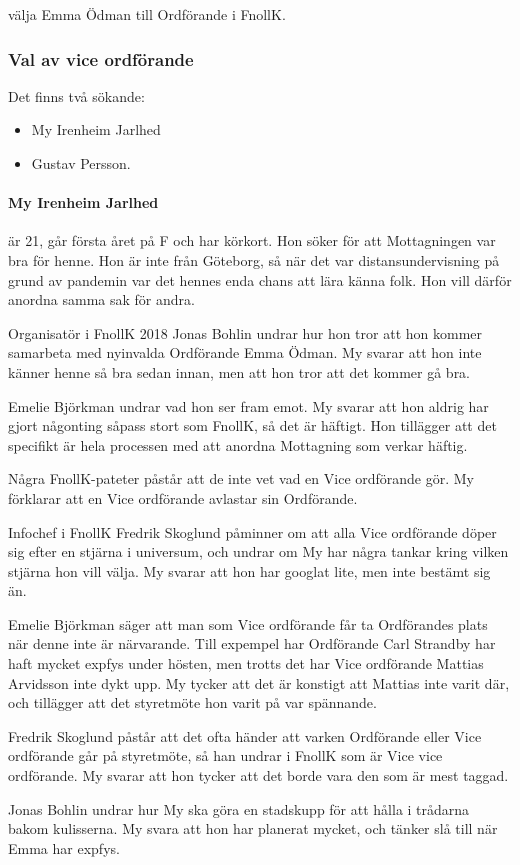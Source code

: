 \documentclass[hidelinks]{sektionsmote}
\begin{document}
\begin{beslut}
  \item välja Emma Ödman till Ordförande i FnollK.
\end{beslut}

\subsubsection{Val av vice ordförande}
Det finns två sökande:
\begin{itemize}
    \item My Irenheim Jarlhed
    \item Gustav Persson.
\end{itemize}

\paragraph{My Irenheim Jarlhed} är 21, går första året på F och har körkort.
Hon söker för att Mottagningen var bra för henne.
Hon är inte från Göteborg, så när det var distansundervisning på grund av pandemin var det hennes enda chans att lära känna folk.
Hon vill därför anordna samma sak för andra.\par
Organisatör i FnollK 2018 Jonas Bohlin undrar hur hon tror att hon kommer samarbeta med nyinvalda Ordförande Emma Ödman.
My svarar att hon inte känner henne så bra sedan innan, men att hon tror att det kommer gå bra.\par
Emelie Björkman undrar vad hon ser fram emot.
My svarar att hon aldrig har gjort någonting såpass stort som FnollK, så det är häftigt.
Hon tillägger att det specifikt är hela processen med att anordna Mottagning som verkar häftig.\par
Några FnollK-pateter påstår att de inte vet vad en Vice ordförande gör.
My förklarar att en Vice ordförande avlastar sin Ordförande.\par
Infochef i FnollK Fredrik Skoglund påminner om att alla Vice ordförande döper sig efter en stjärna i universum, och undrar om My har några tankar kring vilken stjärna hon vill välja.
My svarar att hon har googlat lite, men inte bestämt sig än.\par
Emelie Björkman säger att man som Vice ordförande får ta Ordförandes plats när denne inte är närvarande.
Till expempel har Ordförande Carl Strandby har haft mycket expfys under hösten, men trotts det har Vice ordförande Mattias Arvidsson inte dykt upp.
My tycker att det är konstigt att Mattias inte varit där, och tillägger att det styretmöte hon varit på var spännande.\par
Fredrik Skoglund påstår att det ofta händer att varken Ordförande eller Vice ordförande går på styretmöte, så han undrar i FnollK som är Vice vice ordförande.
My svarar att hon tycker att det borde vara den som är mest taggad.\par
Jonas Bohlin undrar hur My ska göra en stadskupp för att hålla i trådarna bakom kulisserna.
My svara att hon har planerat mycket, och tänker slå till när Emma har expfys.
\end{document}
